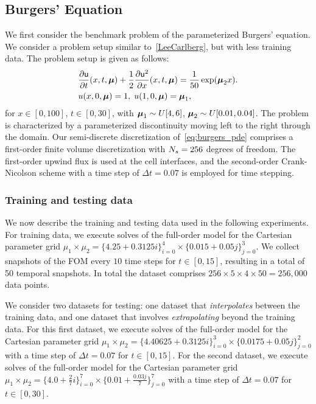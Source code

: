 \documentclass[3p,computermodern,10pt]{elsarticle}
\begin{document}
\subsection{Burgers' Equation}
We first consider the benchmark problem of the parameterized Burgers' equation. We consider a problem setup similar to~\ref{LeeCarlberg}, but with less training data. The problem setup is given as follows: 
\begin{align*}\label{eq:burgers_pde}
&\frac{\partial \mathsf{u}}{\partial t}(x,t,\boldsymbol \mu) + \frac{1}{2} \frac{\partial \mathsf{u}^2}{\partial x}(x,t,\boldsymbol \mu) = \frac{1}{50} \exp(\boldsymbol \mu_2 x). \\
&u(x,0,\boldsymbol \mu) = 1, \; u(1,0,\boldsymbol \mu) = \boldsymbol \mu_1,
\end{align*}
for $x \in [0,100]$, $t \in [0,30]$, with $\boldsymbol \mu_1 \sim U[4,6]$, $\boldsymbol \mu_2 \sim U[0.01,0.04]$.
The problem is characterized by a parameterized discontinuity moving left to the right through the domain. Our semi-discrete discretization of~\eqref{eq:burgers_pde} comprises a first-order finite volume discretization with $N_s=256$ degrees of freedom. The first-order upwind flux is used at the cell interfaces, and the second-order Crank-Nicolson scheme with a time step of $\Delta t = 0.07$ is employed for time stepping.

\subsubsection{Training and testing data}
We now describe the training and testing data used in the following experiments. For training data, we execute solves of the full-order model for the Cartesian parameter grid $\mu_1 \times \mu_2 = \{ 4.25 + 0.3125 i \}_{i=0}^4 \times \{ 0.015 + 0.05 j \}_{j=0}^3$. We collect snapshots of the FOM every $10$ time steps for $t \in [0,15]$, resulting in a total of 50 temporal snapshots. In total the dataset comprises $256 \times 5 \times 4 \times 50 = 256,000$ data points.

We consider two datasets for testing: one dataset that \textit{interpolates} between the training data, and one dataset that involves \textit{extrapolating} beyond the training data. For this first dataset, we execute solves of the full-order model for the Cartesian parameter grid $\mu_1 \times \mu_2 = \{4.40625 + 0.3125 i \}_{i=0}^3 \times \{ 0.0175 + 0.05 j \}_{j=0}^2$ with a time step of $\Delta t = 0.07$ for $t \in [0,15]$. For the second dataset, we execute solves of the full-order model for the Cartesian parameter grid $\mu_1 \times \mu_2 = \{4.0 + \frac{2}{7} i \}_{i=0}^7 \times \{ 0.01 + \frac{0.03 j}{7} \}_{j=0}^7$ with a time step of $\Delta t = 0.07$ for $t \in [0,30]$. 
\end{document}
